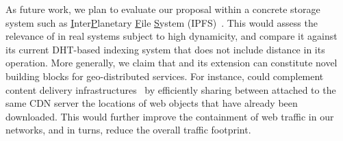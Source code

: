 %
%
%

As future work, we plan to evaluate our proposal within a concrete
storage system such as \underline{I}nter\underline{P}lanetary
\underline{F}ile \underline{S}ystem (IPFS)~\cite{ipfs}. This would
assess the relevance of \NAME in real systems subject to high
dynamicity, and compare it against its current DHT-based indexing
system that does not include distance in its operation. More
generally, we claim that \NAME and its extension can constitute novel
building blocks for geo-distributed services.  For instance, \NAME
could complement content delivery
infrastructures~\cite{triukose2011measuring} by efficiently sharing
between \processes attached to the same CDN server the locations of
web objects that have already been downloaded. This would further
improve the containment of web traffic in our networks, and in turns,
reduce the overall traffic footprint.




